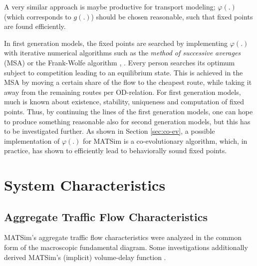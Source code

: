 A very similar approach is maybe productive for transport modeling; $\varphi(.)$ (which corresponds to $g(.)$) should be chosen reasonable, such that fixed points are found efficiently.

In first generation models, the fixed points are searched by implementing $\varphi(.)$ with iterative numerical algorithms such as the \emph{method of successive averages} (MSA) \citep[][p.342f]{OrtuzarWillumsen_2001} or the Frank-Wolfe algorithm \citep[][]{FrankWolfe_NRLQ_1956}, \citep[see also][p.4]{CorreaStier_Cochran_2010}. Every person searches its optimum subject to competition leading to an equilibrium state. This is achieved in the MSA by moving a certain share of the flow to the cheapest route, while taking it away from the remaining routes per OD-relation. For first generation models, much is known about existence, stability, uniqueness and computation of fixed points. Thus, by continuing the lines of the first generation models, one can hope to produce something reasonable also for second generation models, but this has to be investigated further. As shown in Section \ref{sec:co-ev}, a possible implementation of $\varphi(.)$ for MATSim is a co-evolutionary algorithm, which, in practice, has shown to efficiently lead to behaviorally sound fixed points.


\section{System Characteristics}
\subsection{Aggregate Traffic Flow Characteristics}
MATSim's aggregate traffic flow characteristics were analyzed in the common form of the macroscopic fundamental diagram. Some investigations additionally derived MATSim's (implicit) volume-delay function \citep[][]{HorniMontini_STRC_2013}.

